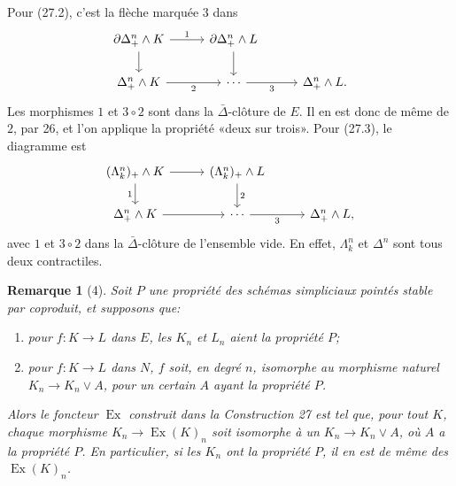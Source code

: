 \documentclass[11pt]{article}
\theoremstyle{deligne}
\newtheorem*{remark*}{Remarque}
\newcommand{\Ex}{\operatorname{Ex}}
\begin{document}
Pour (27.2), c'est la flèche marquée \(3\) dans
\[
\begin{tikzcd}[column sep=2.8em,row sep=1.7em]
\partial\Delta^n_+\wedge K \arrow[r,"1"] \arrow[d] & \partial\Delta^n_+\wedge L \arrow[d] \\
\Delta^n_+\wedge K \arrow[r,"2"'] & \cdots \arrow[r,"3"'] & \Delta^n_+\wedge L .
\end{tikzcd}
\]
Les morphismes \(1\) et \(3\circ2\) sont dans la \(\bar\Delta\)-clôture de \(E\). Il en est donc de même de \(2\), par 26, et l'on applique la propriété «deux sur trois». Pour (27.3), le diagramme est
\[
\begin{tikzcd}[column sep=2.8em,row sep=1.7em]
(\Lambda^n_k)_+\wedge K \arrow[r] \arrow[d,"1"'] & (\Lambda^n_k)_+\wedge L \arrow[d,"2"] \\
\Delta^n_+\wedge K \arrow[r] & \cdots \arrow[r,"3"'] & \Delta^n_+\wedge L,
\end{tikzcd}
\]
avec \(1\) et \(3\circ2\) dans la \(\bar\Delta\)-clôture de l'ensemble vide. En effet, \(\Lambda^n_k\) et \(\Delta^n\) sont tous deux contractiles.

\begin{remark*}[4]
Soit \(P\) une propriété des schémas simpliciaux pointés stable par coproduit, et supposons que:
\begin{enumerate}[label=(\alph*)]
\item pour \(f:K\to L\) dans \(E\), les \(K_n\) et \(L_n\) aient la propriété \(P\);
\item pour \(f:K\to L\) dans \(N\), \(f\) soit, en degré \(n\), isomorphe au morphisme naturel \(K_n\to K_n\vee A\), pour un certain \(A\) ayant la propriété \(P\).
\end{enumerate}
Alors le foncteur \(\Ex\) construit dans la Construction 27 est tel que, pour tout \(K\), chaque morphisme \(K_n\to\Ex(K)_n\) soit isomorphe à un \(K_n\to K_n\vee A\), où \(A\) a la propriété \(P\). En particulier, si les \(K_n\) ont la propriété \(P\), il en est de même des \(\Ex(K)_n\).
\end{remark*}
\end{document}
